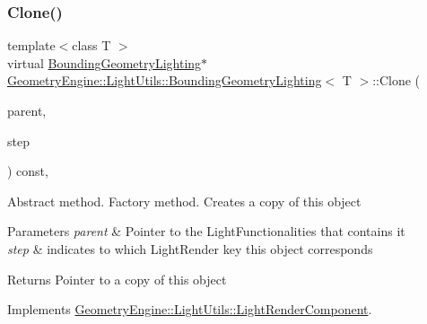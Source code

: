 \subsubsection{\texorpdfstring{Clone()}{Clone()}}
{\footnotesize\ttfamily template$<$class T $>$ \\
virtual \mbox{\hyperlink{class_geometry_engine_1_1_light_utils_1_1_bounding_geometry_lighting}{Bounding\+Geometry\+Lighting}}$\ast$ \mbox{\hyperlink{class_geometry_engine_1_1_light_utils_1_1_bounding_geometry_lighting}{Geometry\+Engine\+::\+Light\+Utils\+::\+Bounding\+Geometry\+Lighting}}$<$ T $>$\+::Clone (\begin{DoxyParamCaption}\item[{\mbox{\hyperlink{class_geometry_engine_1_1_light_utils_1_1_light_component_manager}{Light\+Component\+Manager}} $\ast$}]{parent,  }\item[{\mbox{\hyperlink{namespace_geometry_engine_1_1_light_utils_ac3078de660742daceaa06bd9bc61d24a}{Light\+Render}}}]{step }\end{DoxyParamCaption}) const\hspace{0.3cm}{\ttfamily [inline]}, {\ttfamily [virtual]}}

Abstract method. Factory method. Creates a copy of this object 
\begin{DoxyParams}{Parameters}
{\em parent} & Pointer to the Light\+Functionalities that contains it \\
\hline
{\em step} & indicates to which Light\+Render key this object corresponds \\
\hline
\end{DoxyParams}
\begin{DoxyReturn}{Returns}
Pointer to a copy of this object 
\end{DoxyReturn}


Implements \mbox{\hyperlink{class_geometry_engine_1_1_light_utils_1_1_light_render_component_a0311667e3f6faa30c938303e8eaa9670}{Geometry\+Engine\+::\+Light\+Utils\+::\+Light\+Render\+Component}}.

\mbox{\label{class_geometry_engine_1_1_light_utils_1_1_bounding_geometry_lighting_a604f7fea25829abe9106f929eb2b142f}} 
